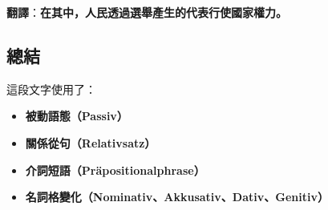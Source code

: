 \documentclass{article}
\begin{document}
\textbf{翻譯}：\textbf{在其中，人民透過選舉產生的代表行使國家權力。}

\subsection{總結}
這段文字使用了：
\begin{itemize}
    \item \textbf{被動語態（Passiv）}
    \item \textbf{關係從句（Relativsatz）}
    \item \textbf{介詞短語（Präpositionalphrase）}
    \item \textbf{名詞格變化（Nominativ、Akkusativ、Dativ、Genitiv）}
\end{itemize}
\end{document}

